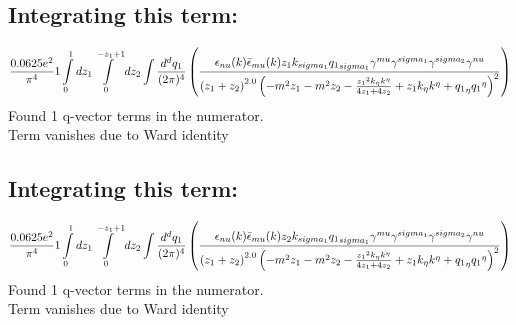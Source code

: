\subsection*{Integrating this term:}
\begin{dmath}\frac{0.0625 e^{2}}{\pi^{4}}1\int\limits_{ 0 }^{ 1 } d{ z_{ 1 } }\int\limits_{ 0 }^{ - { z_{ 1 } } + 1 } d{ z_{ 2 } }\int\frac{d^d q_1 }{ (2\pi)^4 }\left(\frac{\epsilon_{ \\nu }({ k }) \bar{\epsilon}_{ \\mu }({ k }) { z_{ 1 } } { { k }_{ \\sigma_1 } } { { q_1 }_{ \\sigma_1 } } { \gamma^{ \\mu } } { \gamma^{ \\sigma_1 } } { \gamma^{ \\sigma_2 } } { \gamma^{ \\nu } }}{\left({ z_{ 1 } } + { z_{ 2 } }\right)^{2.0} \left(- m^{2} { z_{ 1 } } - m^{2} { z_{ 2 } } - \frac{{ z_{ 1 } }^{2} { { k }_{ \eta } } { { k }^{ \eta } }}{4 { z_{ 1 } } + 4 { z_{ 2 } }} + { z_{ 1 } } { { k }_{ \eta } } { { k }^{ \eta } } + { { q_1 }_{ \eta } } { { q_1 }^{ \eta } }\right)^{2}}\right)\end{dmath}
Found 1 q-vector terms in the numerator.\\
Term vanishes due to Ward identity\\
\subsection*{Integrating this term:}
\begin{dmath}\frac{0.0625 e^{2}}{\pi^{4}}1\int\limits_{ 0 }^{ 1 } d{ z_{ 1 } }\int\limits_{ 0 }^{ - { z_{ 1 } } + 1 } d{ z_{ 2 } }\int\frac{d^d q_1 }{ (2\pi)^4 }\left(\frac{\epsilon_{ \\nu }({ k }) \bar{\epsilon}_{ \\mu }({ k }) { z_{ 2 } } { { k }_{ \\sigma_1 } } { { q_1 }_{ \\sigma_1 } } { \gamma^{ \\mu } } { \gamma^{ \\sigma_1 } } { \gamma^{ \\sigma_2 } } { \gamma^{ \\nu } }}{\left({ z_{ 1 } } + { z_{ 2 } }\right)^{2.0} \left(- m^{2} { z_{ 1 } } - m^{2} { z_{ 2 } } - \frac{{ z_{ 1 } }^{2} { { k }_{ \eta } } { { k }^{ \eta } }}{4 { z_{ 1 } } + 4 { z_{ 2 } }} + { z_{ 1 } } { { k }_{ \eta } } { { k }^{ \eta } } + { { q_1 }_{ \eta } } { { q_1 }^{ \eta } }\right)^{2}}\right)\end{dmath}
Found 1 q-vector terms in the numerator.\\
Term vanishes due to Ward identity\\
